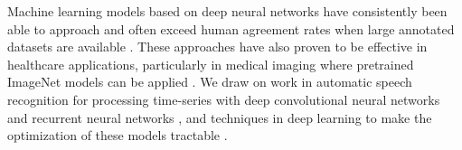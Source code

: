 Machine learning models based on deep neural networks have consistently been
able to approach and often exceed human agreement rates when large annotated
datasets are available \cite{amodei2016deep, xiong2016achieving,he2015delving}.
These approaches have also proven to be effective in healthcare applications,
particularly in medical imaging where pretrained ImageNet models can be applied
\cite{esteva2017dermatologist, gulshan2016development}. We draw on work in
automatic speech recognition for processing time-series with deep convolutional
neural networks and recurrent neural networks \cite{hannun2014deepspeech,
sainath2013deep}, and techniques in deep learning to make the optimization of
these models tractable \cite{he2016deep, he2016identity, ioffe2015batch}.
